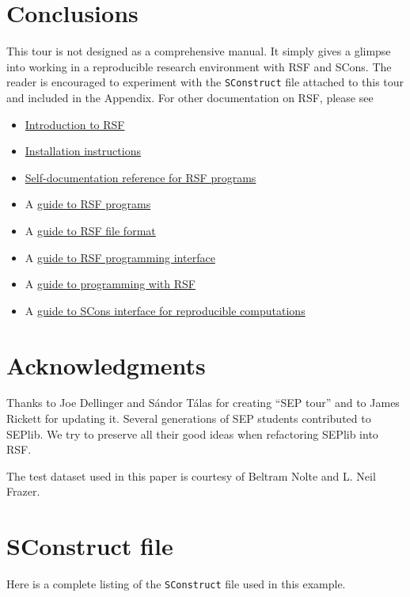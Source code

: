 \section{Conclusions}

This tour is not designed as a comprehensive manual. It simply gives a
glimpse into working in a reproducible research environment with RSF
and SCons. The reader is encouraged to experiment with the
\texttt{SConstruct} file attached to this tour and included in the
Appendix. For other documentation on RSF, please see
\begin{itemize}
\item \href{http://egl.beg.utexas.edu/RSF/book/rsf/rsf/tour_html/}{Introduction to RSF}  
\item  \href{http://egl.beg.utexas.edu/RSF/book/rsf/rsf/install_html/}{Installation instructions}
\item \href{http://egl.beg.utexas.edu/RSF/}{Self-documentation reference for RSF programs}
\item A \href{http://egl.beg.utexas.edu/RSF/book/rsf/rsf/prog_html/}{guide to RSF programs}
\item A \href{http://egl.beg.utexas.edu/RSF/book/rsf/rsf/format_html/}
  {guide to RSF file format}
\item A \href{http://egl.beg.utexas.edu/RSF/book/rsf/rsf/api_html/}{guide to
    RSF programming interface}
\item A \href{http://egl.beg.utexas.edu/RSF/book/rsf/rsf/demo_html/}{guide to programming with RSF}
\item A
  \href{http://egl.beg.utexas.edu/RSF/book/rsf/scons/paper_html/}{guide
    to SCons interface for reproducible computations}
\end{itemize}

\section{Acknowledgments}

Thanks to Joe Dellinger and S\'{a}ndor T\'{a}las for creating ``SEP
tour'' and to James Rickett for updating it. Several generations of
SEP students contributed to SEPlib. We try to preserve all their good
ideas when refactoring SEPlib into RSF.

The test dataset used in this paper is courtesy of Beltram Nolte and L. Neil Frazer.




\appendix
\section{SConstruct file}

Here is a complete listing of the \texttt{SConstruct} file used in this
example.



